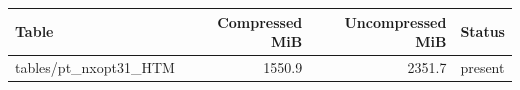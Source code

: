 {\small
\begin{tabular}{lrrl}
\hline
Table & Compressed MiB & Uncompressed MiB & Status \\
\hline
tables/pt\_nxopt31\_HTM & 1550.9 & 2351.7 & present \\
\hline
\end{tabular}
}
